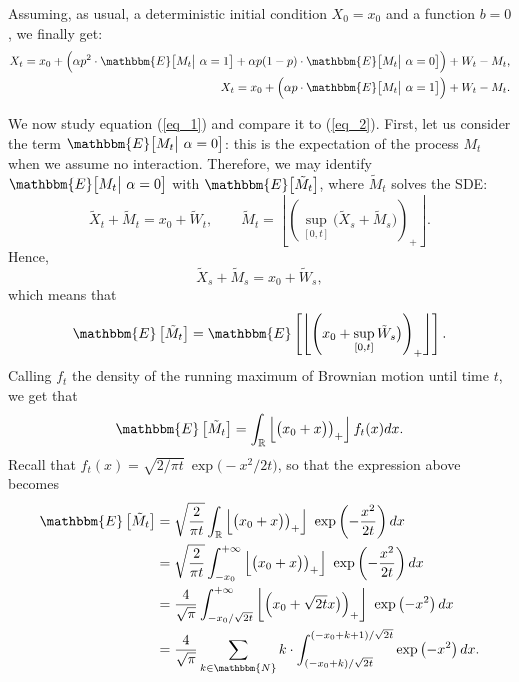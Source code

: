 \documentclass[11pt, a4paper]{article}
\begin{document}
Assuming, as usual, a deterministic initial condition $X_0 = x_0$ and a function $b = 0$, we finally get:
\begin{align}
  X_t = x_0 + \Big( \alpha p^2 \cdot \mathbbm{E} \big[ M_t \big| \  \alpha = 1 \big. \big] + \alpha p (1-p) \cdot \mathbbm{E} \big[ M_t \big| \  \alpha = 0 \big. \big] \Big) + W_t - M_t, \label{eq_1} \\
  X_t = x_0 + \Big( \alpha p \cdot \mathbbm{E} \big[ M_t \big| \  \alpha = 1 \big. \big] \Big) + W_t - M_t. \label{eq_2}
\end{align}

We now study equation (\ref{eq_1}) and compare it to (\ref{eq_2}). First, let us consider the term $\mathbbm{E} \big[ M_t \big| \ \alpha = 0 \big. \big]$: this is the expectation of the process $M_t$ when we assume no interaction. Therefore, we may identify $\mathbbm{E} \big[ M_t \big| \ \alpha = 0 \big. \big]$ with $\mathbbm{E} \big[ \tilde{M}_t \big]$, where $\tilde{M}_t$ solves the SDE: \[ \tilde{X}_t + \tilde{M}_t = x_0 + \tilde{W}_t, \qquad \tilde{M}_t = \left\lfloor \left( \sup_{[0, t]} \big( \tilde{X}_s + \tilde{M}_s \big) \right)_+ \right\rfloor. \] Hence, \[ \tilde{X}_s + \tilde{M}_s = x_0 + \tilde{W}_s, \] which means that \[ \mathbbm{E} \left[ \tilde{M}_t \right] = \mathbbm{E} \left[ \left\lfloor \left( x_0 + \sup_{[0, t]} \tilde{W}_s \big) \right)_+ \right\rfloor \right] . \] Calling $f_t$ the density of the running maximum of Brownian motion until time $t$, we get that \[ \mathbbm{E} \left[ \tilde{M}_t \right] = \int_{\mathbb{R}} \left\lfloor \left( x_0 + x \big) \right)_+ \right\rfloor f_t(x) dx. \]
Recall that $f_t(x) = \sqrt{2/\pi t} \ \exp \big(- x^2 / 2t \big)$, so that the expression above becomes \begin{align*} \mathbbm{E}\left[ \tilde{M}_t \right] &= \sqrt{\frac{2}{\pi t}} \int_{\mathbb{R}} \left\lfloor \left( x_0 + x \big) \right)_+ \right\rfloor \ \exp \left( - \frac{x^2}{2t} \right) dx \\ &= \sqrt{\frac{2}{\pi t}} \int_{-x_0}^{+\infty} \left\lfloor \left( x_0 + x \big) \right)_+ \right\rfloor \ \exp \left( - \frac{x^2}{2t} \right) dx \\ &= \frac{4}{\sqrt{\pi}} \int_{-x_0 / \sqrt{2t}}^{+\infty} \left\lfloor \left( x_0 + \sqrt{2 t} x \big) \right)_+ \right\rfloor \ \exp \left( - x^2 \right) dx \\ &= \frac{4}{\sqrt{\pi}} \sum_{k \in \mathbbm{N}} k \cdot \int_{ (-x_0 + k) / \sqrt{2t}}^{ (-x_0 + k + 1) / \sqrt{2t}} \exp \left( - x^2 \right) dx. \end{align*}
\end{document}
